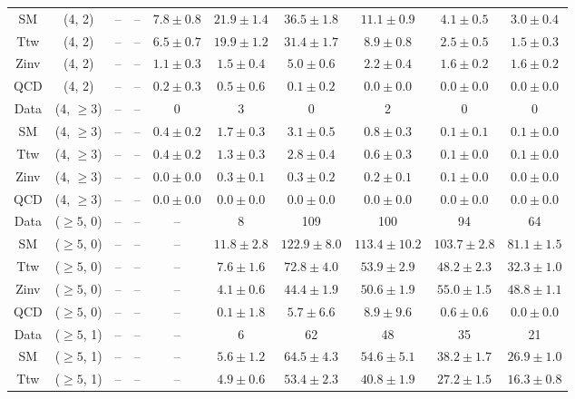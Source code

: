 \begin{table}[h!]
{\begin{tabular}{cccccccccc}
	SM & (4, 2) & -- & -- & $7.8\pm 0.8$ & $21.9\pm 1.4$ & $36.5\pm 1.8$ & $11.1\pm 0.9$ & $4.1\pm 0.5$ & $3.0\pm 0.4$ \\[0.5ex] 
	Ttw & (4, 2) & -- & -- & $6.5\pm 0.7$ & $19.9\pm 1.2$ & $31.4\pm 1.7$ & $8.9\pm 0.8$ & $2.5\pm 0.5$ & $1.5\pm 0.3$ \\[0.5ex] 
	Zinv & (4, 2) & -- & -- & $1.1\pm 0.3$ & $1.5\pm 0.4$ & $5.0\pm 0.6$ & $2.2\pm 0.4$ & $1.6\pm 0.2$ & $1.6\pm 0.2$ \\[0.5ex] 
	QCD & (4, 2) & -- & -- & $0.2\pm 0.3$ & $0.5\pm 0.6$ & $0.1\pm 0.2$ & $0.0\pm 0.0$ & $0.0\pm 0.0$ & $0.0\pm 0.0$ \\[0.5ex] 
	Data & (4, $\ge3$) & -- & -- & 0 & 3 & 0 & 2 & 0 & 0 \\[0.5ex] 
	SM & (4, $\ge3$) & -- & -- & $0.4\pm 0.2$ & $1.7\pm 0.3$ & $3.1\pm 0.5$ & $0.8\pm 0.3$ & $0.1\pm 0.1$ & $0.1\pm 0.0$ \\[0.5ex] 
	Ttw & (4, $\ge3$) & -- & -- & $0.4\pm 0.2$ & $1.3\pm 0.3$ & $2.8\pm 0.4$ & $0.6\pm 0.3$ & $0.1\pm 0.0$ & $0.1\pm 0.0$ \\[0.5ex] 
	Zinv & (4, $\ge3$) & -- & -- & $0.0\pm 0.0$ & $0.3\pm 0.1$ & $0.3\pm 0.2$ & $0.2\pm 0.1$ & $0.1\pm 0.0$ & $0.0\pm 0.0$ \\[0.5ex] 
	QCD & (4, $\ge3$) & -- & -- & $0.0\pm 0.0$ & $0.0\pm 0.0$ & $0.0\pm 0.0$ & $0.0\pm 0.0$ & $0.0\pm 0.0$ & $0.0\pm 0.0$ \\[0.5ex] 
	Data & ($\ge5$, 0) & -- & -- & -- & 8 & 109 & 100 & 94 & 64 \\[0.5ex] 
	SM & ($\ge5$, 0) & -- & -- & -- & $11.8\pm 2.8$ & $122.9\pm 8.0$ & $113.4\pm 10.2$ & $103.7\pm 2.8$ & $81.1\pm 1.5$ \\[0.5ex] 
	Ttw & ($\ge5$, 0) & -- & -- & -- & $7.6\pm 1.6$ & $72.8\pm 4.0$ & $53.9\pm 2.9$ & $48.2\pm 2.3$ & $32.3\pm 1.0$ \\[0.5ex] 
	Zinv & ($\ge5$, 0) & -- & -- & -- & $4.1\pm 0.6$ & $44.4\pm 1.9$ & $50.6\pm 1.9$ & $55.0\pm 1.5$ & $48.8\pm 1.1$ \\[0.5ex] 
	QCD & ($\ge5$, 0) & -- & -- & -- & $0.1\pm 1.8$ & $5.7\pm 6.6$ & $8.9\pm 9.6$ & $0.6\pm 0.6$ & $0.0\pm 0.0$ \\[0.5ex] 
	Data & ($\ge5$, 1) & -- & -- & -- & 6 & 62 & 48 & 35 & 21 \\[0.5ex] 
	SM & ($\ge5$, 1) & -- & -- & -- & $5.6\pm 1.2$ & $64.5\pm 4.3$ & $54.6\pm 5.1$ & $38.2\pm 1.7$ & $26.9\pm 1.0$ \\[0.5ex] 
	Ttw & ($\ge5$, 1) & -- & -- & -- & $4.9\pm 0.6$ & $53.4\pm 2.3$ & $40.8\pm 1.9$ & $27.2\pm 1.5$ & $16.3\pm 0.8$ \\[0.5ex] 

\end{tabular}}
\end{table}
